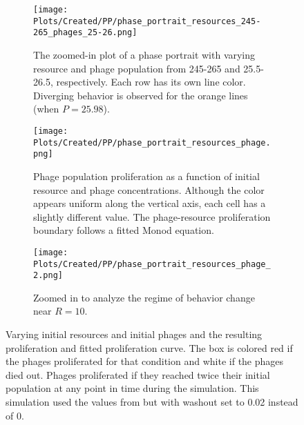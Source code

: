 \begin{figure}[]
    \centering
    \begin{subfigure}{0.49\linewidth}
        \centering
        \texttt{[image: Plots/Created/PP/phase\_portrait\_resources\_245-265\_phages\_25-26.png]}
        \caption{
            The zoomed-in plot of a phase portrait with varying resource and phage population from 245-265 and 25.5-26.5, respectively. 
            Each row has its own line color. 
            Diverging behavior is observed for the orange lines (when $P = 25.98$). 
        }
        \label{fig:created:phase_portrait_resources_245-265_phages_25-26}
    \end{subfigure}
    \hfill
    \begin{subfigure}{0.49\linewidth}
        \centering
        \texttt{[image: Plots/Created/PP/phase\_portrait\_resources\_phage.png]}
        \caption{
            Phage population proliferation as a function of initial resource and phage concentrations. 
            Although the color appears uniform along the vertical axis, each cell has a slightly different value. 
            The phage-resource proliferation boundary follows a fitted Monod equation.
        }
        \label{fig:created:phase_portrait_resources_phage}
    \end{subfigure}
    \hfill
    \begin{subfigure}{0.49\linewidth}
        \centering
        \texttt{[image: Plots/Created/PP/phase\_portrait\_resources\_phage\_2.png]}
        \caption{
            Zoomed in to analyze the regime of behavior change near $R=10$. 
        }
        \label{fig:created:phase_portrait_resources_phage_2}
    \end{subfigure}
    \caption{
        Varying initial resources and initial phages and the resulting proliferation and fitted proliferation curve. 
        The box is colored red if the phages proliferated for that condition and white if the phages died out. 
        Phages proliferated if they reached twice their initial population at any point in time during the simulation. 
        This simulation used the values from  but with washout set to 0.02 instead of 0. 
    }
    \label{fig:created:phase_portrait_resource_phage_proliferate}
\end{figure}

